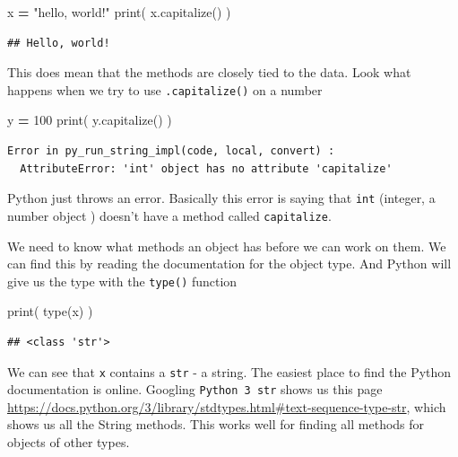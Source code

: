 \documentclass[]{book}
\newenvironment{Shaded}{\begin{snugshade}}{\end{snugshade}}
\newcommand{\BuiltInTok}[1]{#1}
\newcommand{\DecValTok}[1]{\textcolor[rgb]{0.00,0.00,0.81}{#1}}
\newcommand{\NormalTok}[1]{#1}
\newcommand{\OperatorTok}[1]{\textcolor[rgb]{0.81,0.36,0.00}{\textbf{#1}}}
\newcommand{\StringTok}[1]{\textcolor[rgb]{0.31,0.60,0.02}{#1}}
\theoremstyle{definition}
\theoremstyle{definition}
\theoremstyle{definition}
\theoremstyle{remark}
\begin{document}
\begin{Shaded}
\begin{Highlighting}[]
\NormalTok{x }\OperatorTok{=} \StringTok{"hello, world!"}
\BuiltInTok{print}\NormalTok{( x.capitalize() )}
\end{Highlighting}
\end{Shaded}

\begin{verbatim}
## Hello, world!
\end{verbatim}

This does mean that the methods are closely tied to the data. Look what
happens when we try to use \texttt{.capitalize()} on a number

\begin{Shaded}
\begin{Highlighting}[]
\NormalTok{y }\OperatorTok{=} \DecValTok{100}
\BuiltInTok{print}\NormalTok{( y.capitalize() )}
\end{Highlighting}
\end{Shaded}

\begin{verbatim}
Error in py_run_string_impl(code, local, convert) : 
  AttributeError: 'int' object has no attribute 'capitalize'
\end{verbatim}

Python just throws an error. Basically this error is saying that
\texttt{int} (integer, a number object ) doesn't have a method called
\texttt{capitalize}.

We need to know what methods an object has before we can work on them.
We can find this by reading the documentation for the object type. And
Python will give us the type with the \texttt{type()} function

\begin{Shaded}
\begin{Highlighting}[]
\BuiltInTok{print}\NormalTok{( }\BuiltInTok{type}\NormalTok{(x) )}
\end{Highlighting}
\end{Shaded}

\begin{verbatim}
## <class 'str'>
\end{verbatim}

We can see that \texttt{x} contains a \texttt{str} - a string. The
easiest place to find the Python documentation is online. Googling
\texttt{Python\ 3\ str} shows us this page
\href{}{https://docs.python.org/3/library/stdtypes.html\#text-sequence-type-str},
which shows us all the String methods. This works well for finding all
methods for objects of other types.
\end{document}
